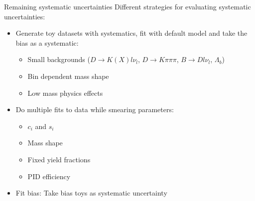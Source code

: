 \documentclass{beamer}
\begin{document}
\begin{frame}{Remaining systematic uncertainties}
  Different strategies for evaluating systematic uncertainties:
  \vspace{0.2cm}
  \begin{itemize}
    \setlength\itemsep{1em}
    \item{Generate toy datasets with systematics, fit with default model and take the bias as a systematic:}
    \begin{itemize}
      \item{Small backgrounds ($D\to K(X)l\nu_l$, $D\to K\pi\pi\pi$, $B\to Dl\nu_l$, $\Lambda_b$)}
      \item{Bin dependent mass shape}
      \item{Low mass physics effects}
    \end{itemize}
    \item{Do multiple fits to data while smearing parameters:}
    \begin{itemize}
      \item{$c_i$ and $s_i$}
      \item{Mass shape}
      \item{Fixed yield fractions}
      \item{PID efficiency}
    \end{itemize}
    \item{Fit bias: Take bias toys as systematic uncertainty}
  \end{itemize}
\end{frame}
\end{document}
